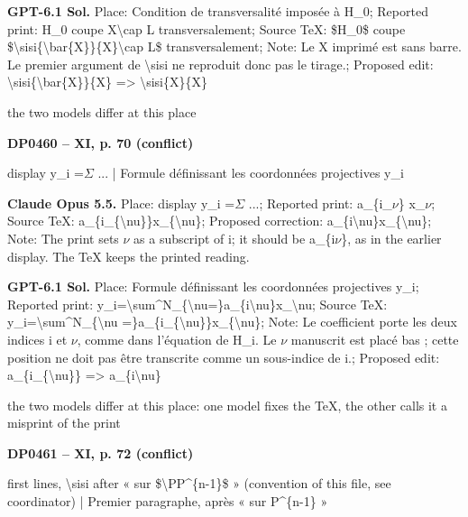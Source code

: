 \textbf{GPT-6.1 Sol.} Place: Condition de transversalité imposée à H\_0; Reported print: H\_0 coupe X\textbackslash{}cap L transversalement; Source TeX: \$H\_0\$ coupe \$\textbackslash{}sisi\{\textbackslash{}bar\{X\}\}\{X\}\textbackslash{}cap L\$ transversalement; Note: Le X imprimé est sans barre. Le premier argument de \textbackslash{}sisi ne reproduit donc pas le tirage.; Proposed edit: \textbackslash{}sisi\{\textbackslash{}bar\{X\}\}\{X\} =\allowbreak > \textbackslash{}sisi\{X\}\{X\}\par
the two models differ at this place\par
\par\noindent\hypertarget{DP0460}{}\textbf{DP0460 -- XI, p. 70 (conflict)}\par
display y\_i =\allowbreak  \ensuremath{\Sigma} ... | Formule définissant les coordonnées projectives y\_i\par
\textbf{Claude Opus 5.5.} Place: display y\_i =\allowbreak  \ensuremath{\Sigma} ...; Reported print: a\_\{i\_\ensuremath{\nu}\} x\_\ensuremath{\nu}; Source TeX: a\_\{i\_\{\textbackslash{}nu\}\}x\_\{\textbackslash{}nu\}; Proposed correction: a\_\{i\textbackslash{}nu\}x\_\{\textbackslash{}nu\}; Note: The print sets \ensuremath{\nu} as a subscript of i; it should be a\_\{i\ensuremath{\nu}\}, as in the earlier display. The TeX keeps the printed reading.\par
\textbf{GPT-6.1 Sol.} Place: Formule définissant les coordonnées projectives y\_i; Reported print: y\_i=\allowbreak \textbackslash{}sum\textasciicircum{}N\_\{\textbackslash{}nu=\}a\_\{i\textbackslash{}nu\}x\_\textbackslash{}nu; Source TeX: y\_i=\allowbreak \textbackslash{}sum\textasciicircum{}N\_\{\textbackslash{}nu =\}a\_\{i\_\{\textbackslash{}nu\}\}x\_\{\textbackslash{}nu\}; Note: Le coefficient porte les deux indices i et \ensuremath{\nu}, comme dans l'équation de H\_i. Le \ensuremath{\nu} manuscrit est placé bas ; cette position ne doit pas être transcrite comme un sous-indice de i.; Proposed edit: a\_\{i\_\{\textbackslash{}nu\}\} =\allowbreak > a\_\{i\textbackslash{}nu\}\par
the two models differ at this place: one model fixes the TeX, the other calls it a misprint of the print\par
\par\noindent\hypertarget{DP0461}{}\textbf{DP0461 -- XI, p. 72 (conflict)}\par
first lines, \textbackslash{}sisi after « sur \$\textbackslash{}PP\textasciicircum{}\{n-1\}\$ » (convention of this file, see coordinator) | Premier paragraphe, après « sur P\textasciicircum{}\{n-1\} »\par
